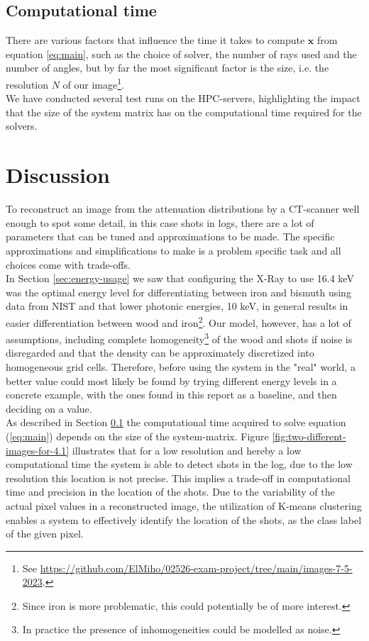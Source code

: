 \documentclass{article}
\begin{document}
\subsection{Computational time}\label{sec:computational-time}
There are various factors that influence the time it takes to compute $\mathbf{x}$ from equation \ref{eq:main}, such as the choice of solver, the number of rays used and the number of angles, but by far the most significant factor is the size, i.e. the resolution $N$ of our image\footnote[12]{See \url{https://github.com/ElMiho/02526-exam-project/tree/main/images-7-5-2023}.}. \\
We have conducted several test runs on the HPC-servers, highlighting the impact that the size of the system matrix has on the computational time required for the solvers\footnotemark[12].

\section{Discussion}\label{sec:discussion}
\vspace*{-0.3\baselineskip}
To reconstruct an image from the attenuation distributions by a CT-scanner well enough to spot some detail, in this case shots in logs, there are a lot of parameters that can be tuned and approximations to be made. The specific approximations and simplifications to make is a problem specific task and all choices come with trade-offs. \\
In Section \ref{sec:energy-usage} we saw that configuring the X-Ray to use 16.4 keV was the optimal energy level for differentiating between iron and bismuth using data from NIST and that lower photonic energies, 10 keV, in general results in easier differentiation between wood and iron\footnote[13]{Since iron is more problematic, this could potentially be of more interest.}. Our model, however, has a lot of assumptions, including complete homogeneity\footnote[14]{In practice the presence of inhomogeneities could be modelled as noise.} of the wood and shots if noise is disregarded and that the density can be approximately discretized into homogeneous grid cells. Therefore, before using the system in the "real" world, a better value could most likely be found by trying different energy levels in a concrete example, with the ones found in this report as a baseline, and then deciding on a value. \\
As described in Section \ref{sec:computational-time} the computational time acquired to solve equation (\ref{eq:main}) depends on the size of the system-matrix. Figure \ref{fig:two-different-images-for-4.1} illustrates that for a low resolution and hereby a low computational time the system is able to detect shots in the log, due to the low resolution this location is not precise. This implies a trade-off in computational time and precision in the location of the shots. 
Due to the variability of the actual pixel values in a reconstructed image, the utilization of K-means clustering enables a system to effectively identify the location of the shots, as the class label of the given pixel. 
\end{document}
